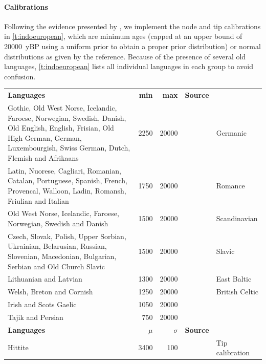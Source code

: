 \documentclass[]{rsos}%
\begin{document}
\paragraph{Calibrations}
Following the evidence presented by \textcite[Tables 7 and 12]{chang2015ancestryconstrained}, we implement the node and tip calibrations in \cref{t:indoeuropean}, which are minimum ages (capped at an upper bound of 20000~yBP using a uniform prior to obtain a proper prior distribution) or normal distributions as given by the reference. Because of the presence of several old languages, \cref{t:indoeuropean} lists all individual languages in each group to avoid confusion.
\begin{table}
  \centering
    \begin{tabular}{p{7cm}rrcl}
    \textbf{Languages} & \textbf{min} & \textbf{max} & \textbf{Source} \\
    Gothic, Old West Norse, Icelandic, Faroese, Norwegian, Swedish, Danish, Old English, English, Frisian, Old High German, German, Luxembourgish, Swiss German, Dutch, Flemish and Afrikaans & 2250 & 20000 & \parencite{chang2015ancestryconstrained} & Germanic  \\
    Latin, Nuorese, Cagliari, Romanian, Catalan, Portuguese, Spanish, French, Provencal, Walloon, Ladin, Romansh, Friulian and Italian & 1750 & 20000 & \parencite{chang2015ancestryconstrained} & Romance  \\
    Old West Norse, Icelandic, Faroese, Norwegian, Swedish and Danish & 1500 & 20000 & \parencite{chang2015ancestryconstrained} & Scandinavian  \\
    Czech, Slovak, Polish, Upper Sorbian, Ukrainian, Belarusian, Russian, Slovenian, Macedonian, Bulgarian, Serbian and Old Church Slavic & 1500 & 20000 & \parencite{chang2015ancestryconstrained} & Slavic  \\
    Lithuanian and Latvian & 1300 & 20000 & \parencite{chang2015ancestryconstrained} & East Baltic  \\
    Welsh, Breton and Cornish & 1250 & 20000 & \parencite{chang2015ancestryconstrained} & British Celtic  \\
    Irish and Scots Gaelic & 1050 & 20000 & \parencite{chang2015ancestryconstrained}  \\
    Tajik and Persian & 750 & 20000 & \parencite{chang2015ancestryconstrained}  \\
    \textbf{Languages} & \textbf{$\mu$} & \textbf{$\sigma$} & \textbf{Source} \\
    Hittite & 3400 & 100 & \parencite{chang2015ancestryconstrained} & Tip calibration \\

\end{tabular}
\end{table}
\end{document}
